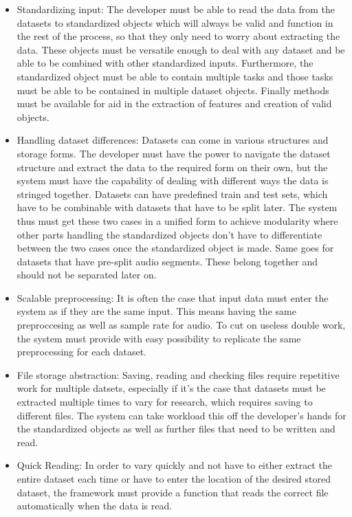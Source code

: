 \begin{itemize}
	\item Standardizing input: The developer must be able to read the data from the datasets to standardized objects which will always be valid and function in the rest of the process, so that they only need to worry about extracting the data. These objects must be versatile enough to deal with any dataset and be able to be combined with other standardized inputs. Furthermore, the standardized object must be able to contain multiple tasks and those tasks must be able to be contained in multiple dataset objects. Finally methods must be available for aid in the extraction of features and creation of valid objects.
	\item Handling dataset differences: Datasets can come in various structures and storage forms. The developer must have the power to navigate the dataset structure and extract the data to the required form on their own, but the system must have the capability of dealing with different ways the data is stringed together. Datasets can have predefined train and test sets, which have to be combinable with datasets that have to be split later. The system thus must get these two cases in a unified form to achieve modularity where other parts handling the standardized objects don't have to differentiate between the two cases once the standardized object is made. Same goes for datasets that have pre-split audio segments. These belong together and should not be separated later on.
	\item Scalable preprocessing: It is often the case that input data must enter the system as if they are the same input. This means having the same preproccesing as well as sample rate for audio. To cut on useless double work, the system must provide with easy possibility to replicate the same preprocessing for each dataset.
	\item File storage abstraction: Saving, reading and checking files require repetitive work for multiple datsets, especially if it's the case that datasets must be extracted multiple times to vary for research, which requires saving to different files. The system can take workload this off the developer's hands for the standardized objects as well as further files that need to be written and read.
	\item Quick Reading: In order to vary quickly and not have to either extract the entire dataset each time or have to enter the location of the desired stored dataset, the framework must provide a function that reads the correct file automatically when the data is read. 
\end{itemize}


